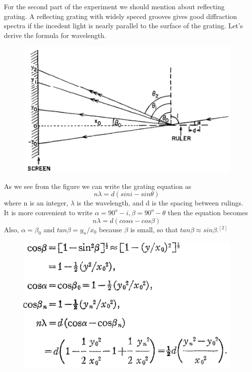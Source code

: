 \documentclass[11pt,a4paper]{article}
\begin{document}
{		\par For the second part of the experiment we should mention about reflecting grating. A reflecting grating with widely speced grooves gives good diffraction spectra if the incedent light is nearly parallel to the surface of the grating. Let's derive the formula for wavelength.
		\begin{figure}[H]
			\begin{center}
				\includegraphics[scale=0.7]{cetvel.png}
			\end{center}
		\end{figure}
	    As we see from the figure we can write the grating equation as
	    \begin{equation}
	    n\lambda=d(sini-sin\theta)
	    \end{equation}
	    where n is an integer, $\lambda$ is the wavelength, and d is the spacing between rulings. It is more convenient to write $\alpha=90^o-i, \beta=90^o-\theta$ then the equation becomes
	    \begin{equation}
	    n\lambda=d(cos\alpha-cos\beta)
	    \end{equation}
	    Also, $\alpha=\beta_0$ and $tan\beta=y_n/x_0$ because $\beta$ is small, so that $tan\beta\approx sin\beta$.$^{[2]}$
	    	\begin{figure}[H]
	    	\begin{center}
	    		\includegraphics[scale=0.7]{cet.png}

\end{center}
\end{figure}}
\end{document}
